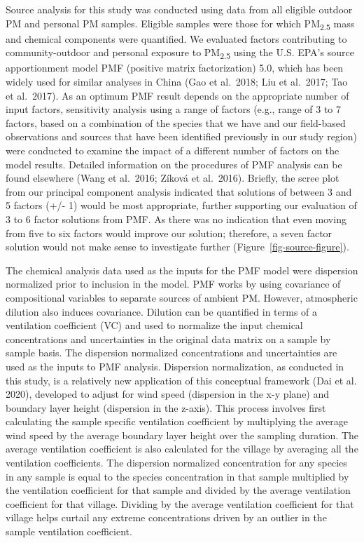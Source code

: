 \documentclass[
  letterpaper,
  DIV=11,
  numbers=noendperiod]{scrartcl}
\begin{document}
Source analysis for this study was conducted using data from all
eligible outdoor PM and personal PM samples. Eligible samples were those
for which PM\textsubscript{2.5} mass and chemical components were
quantified. We evaluated factors contributing to community-outdoor and
personal exposure to PM\textsubscript{2.5} using the U.S. EPA's source
apportionment model PMF (positive matrix factorization) 5.0, which has
been widely used for similar analyses in China (Gao et al.~2018; Liu et
al.~2017; Tao et al.~2017). As an optimum PMF result depends on the
appropriate number of input factors, sensitivity analysis using a range
of factors (e.g., range of 3 to 7 factors, based on a combination of the
species that we have and our field-based observations and sources that
have been identified previously in our study region) were conducted to
examine the impact of a different number of factors on the model
results. Detailed information on the procedures of PMF analysis can be
found elsewhere (Wang et al.~2016; Zíková et al.~2016). Briefly, the
scree plot from our principal component analysis indicated that
solutions of between 3 and 5 factors (+/- 1) would be most appropriate,
further supporting our evaluation of 3 to 6 factor solutions from PMF.
As there was no indication that even moving from five to six factors
would improve our solution; therefore, a seven factor solution would not
make sense to investigate further (Figure~\ref{fig-source-figure}).

The chemical analysis data used as the inputs for the PMF model were
dispersion normalized prior to inclusion in the model. PMF works by
using covariance of compositional variables to separate sources of
ambient PM. However, atmospheric dilution also induces covariance.
Dilution can be quantified in terms of a ventilation coefficient (VC)
and used to normalize the input chemical concentrations and
uncertainties in the original data matrix on a sample by sample basis.
The dispersion normalized concentrations and uncertainties are used as
the inputs to PMF analysis. Dispersion normalization, as conducted in
this study, is a relatively new application of this conceptual framework
(Dai et al. 2020), developed to adjust for wind speed (dispersion in the
x-y plane) and boundary layer height (dispersion in the z-axis). This
process involves first calculating the sample specific ventilation
coefficient by multiplying the average wind speed by the average
boundary layer height over the sampling duration. The average
ventilation coefficient is also calculated for the village by averaging
all the ventilation coefficients. The dispersion normalized
concentration for any species in any sample is equal to the species
concentration in that sample multiplied by the ventilation coefficient
for that sample and divided by the average ventilation coefficient for
that village. Dividing by the average ventilation coefficient for that
village helps curtail any extreme concentrations driven by an outlier in
the sample ventilation coefficient.
\end{document}
